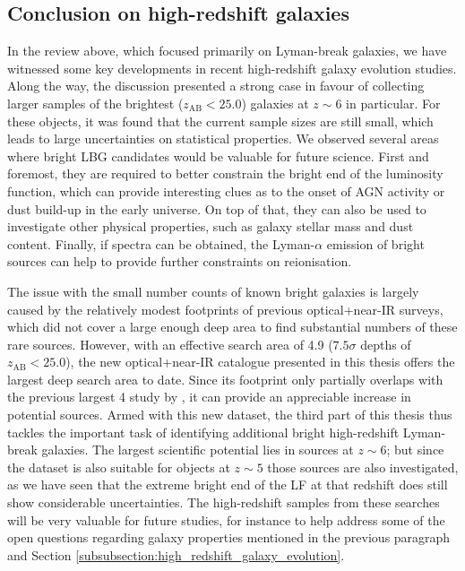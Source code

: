\subsection{Conclusion on high-redshift galaxies}\label{subsection:conclusion_high_z_intro}
In the review above, which focused primarily on Lyman-break galaxies, we have witnessed some key developments in recent high-redshift galaxy evolution studies. Along the way, the discussion presented a strong case in favour of collecting larger samples of the brightest ($z_{\mathrm{AB}}<25.0$) galaxies at $z\sim6$ in particular. For these objects, it was found that the current sample sizes are still small, which leads to large uncertainties on statistical properties. We observed several areas where bright LBG candidates would be valuable for future science. First and foremost, they are required to better constrain the bright end of the luminosity function, which can provide interesting clues as to the onset of AGN activity or dust build-up in the early universe. On top of that, they can also be used to investigate other physical properties, such as galaxy stellar mass and dust content. Finally, if spectra can be obtained, the Lyman-$\alpha$ emission of bright sources can help to provide further constraints on reionisation. \par 

The issue with the small number counts of known bright galaxies is largely caused by the relatively modest footprints of previous optical+near-IR surveys, which did not cover a large enough deep area to find substantial numbers of these rare sources. However, with an effective search area of \SI{4.9}{\sqdeg} ($7.5\sigma$ depths of $z_{\mathrm{AB}}<25.0$), the new optical+near-IR catalogue presented in this thesis offers the largest deep search area to date. Since its footprint only partially overlaps with the previous largest \SI{4}{\sqdeg} study by \cite{2013AJ....145....4W}, it
can provide an appreciable increase in potential sources. Armed with this new dataset, the third part of this thesis thus tackles the important task of identifying additional bright high-redshift Lyman-break galaxies. The largest scientific potential lies in sources at $z\sim6$; but since the dataset is also suitable for objects at $z\sim5$ those sources are also investigated, as we have seen that the extreme bright end of the LF at that redshift does still show considerable uncertainties. The high-redshift samples from these searches will be very valuable for future studies, for instance to help address some of the open questions regarding galaxy properties mentioned in the previous paragraph and Section \ref{subsubsection:high_redshift_galaxy_evolution}. \par




